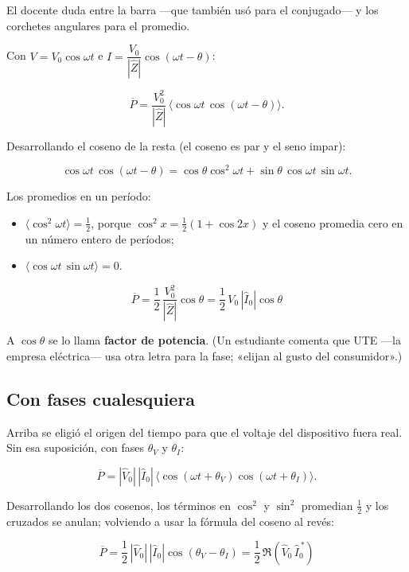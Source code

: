 \documentclass[12pt,a4paper]{article}
\begin{document}
\begin{notebox}
El docente duda entre la barra ---que también usó para el conjugado--- y los
corchetes angulares para el promedio.
\end{notebox}

Con $V = V_0\cos\omega t$ e $I = \dfrac{V_0}{|\hat Z|}\cos(\omega t-\theta)$:

\[
\overline{P} = \frac{V_0^2}{|\hat Z|}\,\big\langle\cos\omega t\,\cos(\omega t-\theta)\big\rangle .
\]

Desarrollando el coseno de la resta (el coseno es par y el seno impar):

\[
\cos\omega t\,\cos(\omega t-\theta) = \cos\theta\cos^2\omega t + \sin\theta\,\cos\omega t\,\sin\omega t .
\]

Los promedios en un período:

\begin{itemize}
  \item $\langle\cos^2\omega t\rangle = \tfrac12$, porque
  $\cos^2x = \tfrac12(1+\cos2x)$ y el coseno promedia cero en un número entero
  de períodos;
  \item $\langle\cos\omega t\,\sin\omega t\rangle = 0$.
\end{itemize}

\begin{keybox}
\[
\boxed{\ \overline{P} = \frac12\,\frac{V_0^2}{|\hat Z|}\cos\theta
= \frac12\,V_0\,|\hat I_0|\cos\theta\ }
\]
\end{keybox}

A $\cos\theta$ se lo llama \textbf{factor de potencia}. (Un estudiante comenta que
UTE ---la empresa eléctrica--- usa otra letra para la fase; «elijan al gusto del
consumidor».)

\subsection{Con fases cualesquiera}

Arriba se eligió el origen del tiempo para que el voltaje del dispositivo fuera
real. Sin esa suposición, con fases $\theta_V$ y $\theta_I$:

\[
\overline{P} = |\hat V_0|\,|\hat I_0|\,
\big\langle\cos(\omega t+\theta_V)\cos(\omega t+\theta_I)\big\rangle .
\]

Desarrollando los dos cosenos, los términos en $\cos^2$ y $\sin^2$ promedian
$\tfrac12$ y los cruzados se anulan; volviendo a usar la fórmula del coseno al
revés:

\begin{keybox}
\[
\boxed{\ \overline{P} = \frac12\,|\hat V_0|\,|\hat I_0|\cos(\theta_V-\theta_I)
= \frac12\,\Re\!\left(\hat V_0\,\hat I_0^{\,*}\right)\ }
\]
\end{keybox}
\end{document}
